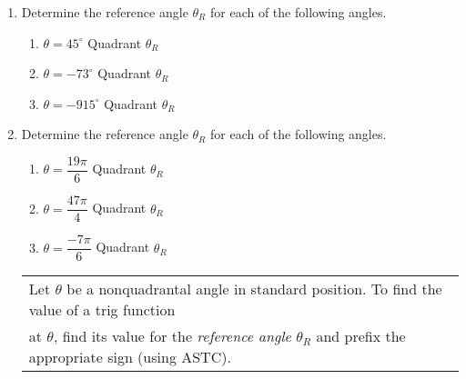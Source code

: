 \begin{enumerate}
\item Determine the reference angle $\theta_R$ for each of the following angles.
\begin{enumerate}
\item $\theta = 45^\circ$ \hspace{1in} Quadrant \underline{\phantom{sldkjfslkdjf}} \hspace{1in} $\theta_R$ \underline{\phantom{sldkjfslkdjf}} \\[.8in]
\item $\theta = -73^\circ$ \hspace{1in} Quadrant \underline{\phantom{sldkjfslkdjf}} \hspace{1in} $\theta_R$ \underline{\phantom{sldkjfslkdjf}}  \\[.8in]

\item $\theta = -915^\circ$ \hspace{1in} Quadrant \underline{\phantom{sldkjfslkdjf}} \hspace{1in} $\theta_R$ \underline{\phantom{sldkjfslkdjf}}  \\[.8in]

\end{enumerate}

\item Determine the reference angle $\theta_R$ for each of the following angles. 
\begin{enumerate}

\item $\theta = \dfrac{19\pi}{6}$ \hspace{1in} Quadrant \underline{\phantom{sldkjfslkdjf}} \hspace{1in} $\theta_R$ \underline{\phantom{sldkjfslkdjf}} \vfill
\item $\theta = \dfrac{47\pi}{4}$ \hspace{1in} Quadrant \underline{\phantom{sldkjfslkdjf}} \hspace{1in} $ \theta_R$ \underline{\phantom{sldkjfslkdjf}} \vfill
\item $\theta = \dfrac{-7\pi}{6}$ \hspace{1in} Quadrant \underline{\phantom{sldkjfslkdjf}} \hspace{1in} $\theta_R$ \underline{\phantom{sldkjfslkdjf}} \vfill

\end{enumerate}

\newpage


\hspace{-.3in}\begin{tabular}{| l |} \hline
Let $\theta$ be a nonquadrantal angle in standard position. To find the value of a trig function\\ at $\theta$, find its value for the \emph{reference angle} $\theta_R$ and prefix the appropriate sign (using ASTC). \\ \hline
\end{tabular}


\end{enumerate}
